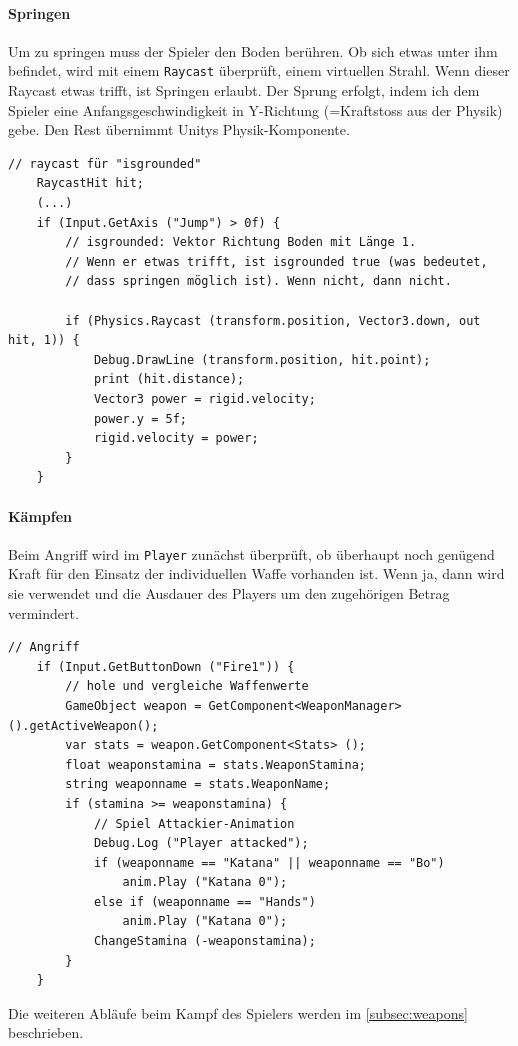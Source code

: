 \paragraph{Springen}
Um zu springen muss der Spieler den Boden berühren.
Ob sich etwas unter ihm befindet, wird mit einem \lstinline{Raycast} überprüft, einem virtuellen Strahl.
Wenn dieser Raycast etwas trifft, ist Springen erlaubt.
Der Sprung erfolgt, indem ich dem Spieler eine Anfangsgeschwindigkeit in Y-Richtung (=Kraftstoss aus der Physik) gebe. Den Rest übernimmt Unitys Physik-Komponente.

\begin{lstlisting}[caption={Springen}]
	// raycast für "isgrounded"
	RaycastHit hit;
	(...)
	if (Input.GetAxis ("Jump") > 0f) {
		// isgrounded: Vektor Richtung Boden mit Länge 1. 
		// Wenn er etwas trifft, ist isgrounded true (was bedeutet,
		// dass springen möglich ist). Wenn nicht, dann nicht. 

		if (Physics.Raycast (transform.position, Vector3.down, out hit, 1)) {
			Debug.DrawLine (transform.position, hit.point);
			print (hit.distance);
			Vector3 power = rigid.velocity;
			power.y = 5f;
			rigid.velocity = power;
		}
	}
\end{lstlisting}

\paragraph{Kämpfen}
Beim Angriff wird im \lstinline{Player} zunächst überprüft, ob überhaupt noch genügend Kraft für den Einsatz der individuellen Waffe vorhanden ist. Wenn ja, dann wird sie verwendet und die Ausdauer des Players um den zugehörigen Betrag vermindert.

\begin{lstlisting}[caption={Angriff}]
	// Angriff
	if (Input.GetButtonDown ("Fire1")) {	
		// hole und vergleiche Waffenwerte
		GameObject weapon = GetComponent<WeaponManager> ().getActiveWeapon();
		var stats = weapon.GetComponent<Stats> ();
		float weaponstamina = stats.WeaponStamina;
		string weaponname = stats.WeaponName;
		if (stamina >= weaponstamina) {
			// Spiel Attackier-Animation
			Debug.Log ("Player attacked");
			if (weaponname == "Katana" || weaponname == "Bo")
				anim.Play ("Katana 0");
			else if (weaponname == "Hands")
				anim.Play ("Katana 0"); 
			ChangeStamina (-weaponstamina);
		}
	}
\end{lstlisting}
		
Die weiteren Abläufe beim Kampf des Spielers werden im \cref{subsec:weapons} beschrieben.

